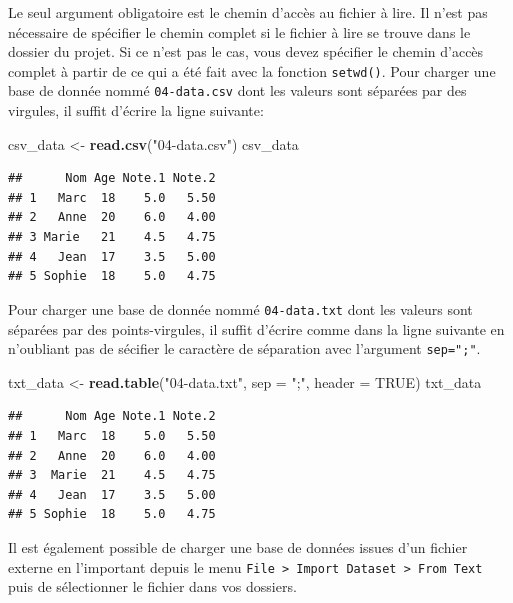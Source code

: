 \documentclass[
]{book}
\newenvironment{Shaded}{\begin{snugshade}}{\end{snugshade}}
\newcommand{\AttributeTok}[1]{\textcolor[rgb]{0.13,0.29,0.53}{#1}}
\newcommand{\ConstantTok}[1]{\textcolor[rgb]{0.56,0.35,0.01}{#1}}
\newcommand{\FunctionTok}[1]{\textcolor[rgb]{0.13,0.29,0.53}{\textbf{#1}}}
\newcommand{\NormalTok}[1]{#1}
\newcommand{\OtherTok}[1]{\textcolor[rgb]{0.56,0.35,0.01}{#1}}
\newcommand{\StringTok}[1]{\textcolor[rgb]{0.31,0.60,0.02}{#1}}
\begin{document}
Le seul argument obligatoire est le chemin d'accès au fichier à lire. Il n'est pas nécessaire de spécifier le chemin complet si le fichier à lire se trouve dans le dossier du projet. Si ce n'est pas le cas, vous devez spécifier le chemin d'accès complet à partir de ce qui a été fait avec la fonction \texttt{setwd()}. Pour charger une base de donnée nommé \texttt{04-data.csv} dont les valeurs sont séparées par des virgules, il suffit d'écrire la ligne suivante:

\begin{Shaded}
\begin{Highlighting}[]
\NormalTok{csv\_data }\OtherTok{\textless{}{-}} \FunctionTok{read.csv}\NormalTok{(}\StringTok{"04{-}data.csv"}\NormalTok{)}
\NormalTok{csv\_data}
\end{Highlighting}
\end{Shaded}

\begin{verbatim}
##      Nom Age Note.1 Note.2
## 1   Marc  18    5.0   5.50
## 2   Anne  20    6.0   4.00
## 3 Marie   21    4.5   4.75
## 4   Jean  17    3.5   5.00
## 5 Sophie  18    5.0   4.75
\end{verbatim}

Pour charger une base de donnée nommé \texttt{04-data.txt} dont les valeurs sont séparées par des points-virgules, il suffit d'écrire comme dans la ligne suivante en n'oubliant pas de sécifier le caractère de séparation avec l'argument \texttt{sep=";"}.

\begin{Shaded}
\begin{Highlighting}[]
\NormalTok{txt\_data }\OtherTok{\textless{}{-}} \FunctionTok{read.table}\NormalTok{(}\StringTok{"04{-}data.txt"}\NormalTok{, }\AttributeTok{sep =} \StringTok{";"}\NormalTok{, }\AttributeTok{header =} \ConstantTok{TRUE}\NormalTok{)}
\NormalTok{txt\_data}
\end{Highlighting}
\end{Shaded}

\begin{verbatim}
##      Nom Age Note.1 Note.2
## 1   Marc  18    5.0   5.50
## 2   Anne  20    6.0   4.00
## 3  Marie  21    4.5   4.75
## 4   Jean  17    3.5   5.00
## 5 Sophie  18    5.0   4.75
\end{verbatim}

Il est également possible de charger une base de données issues d'un fichier externe en l'important depuis le menu \texttt{File\ \textgreater{}\ Import\ Dataset\ \textgreater{}\ From\ Text} puis de sélectionner le fichier dans vos dossiers.
\end{document}
